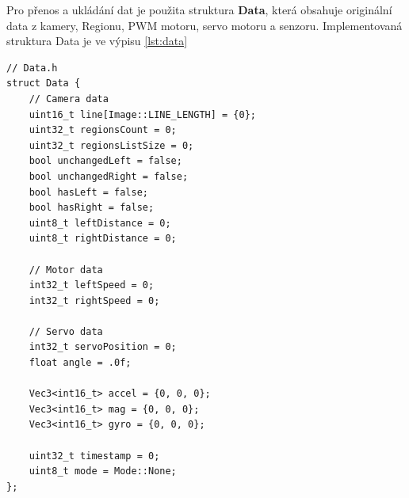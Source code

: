 Pro přenos a ukládání dat je použita struktura \textbf{Data}, která obsahuje originální data z kamery, Regionu, PWM motoru, servo motoru a senzoru. Implementovaná struktura Data je ve výpisu \ref{lst:data}
\begin{lstlisting}[caption=structura Data, label=lst:data]
// Data.h
struct Data {
    // Camera data
    uint16_t line[Image::LINE_LENGTH] = {0};
    uint32_t regionsCount = 0;
    uint32_t regionsListSize = 0;
    bool unchangedLeft = false;
    bool unchangedRight = false;
    bool hasLeft = false;
    bool hasRight = false;
    uint8_t leftDistance = 0;
    uint8_t rightDistance = 0;

    // Motor data
    int32_t leftSpeed = 0;
    int32_t rightSpeed = 0;

    // Servo data
    int32_t servoPosition = 0;
    float angle = .0f;

    Vec3<int16_t> accel = {0, 0, 0};
    Vec3<int16_t> mag = {0, 0, 0};
    Vec3<int16_t> gyro = {0, 0, 0};

    uint32_t timestamp = 0;
    uint8_t mode = Mode::None;
};
\end{lstlisting}

\endinput

